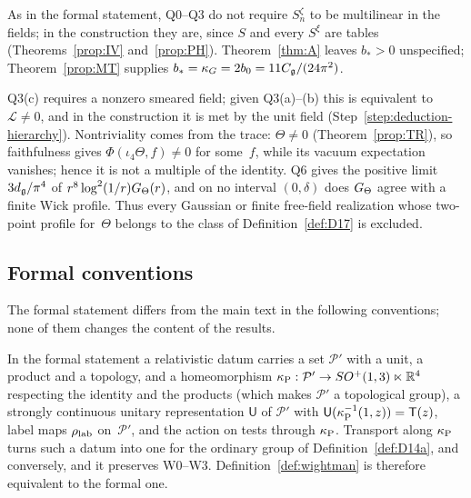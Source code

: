 As in the formal statement, Q0--Q3 do not require $S_n^\zeta$ to be multilinear in the fields; in the construction they are, since $S$ and every $S^\xi$ are tables (Theorems~\ref{prop:IV} and~\ref{prop:PH}). Theorem~\ref{thm:A} leaves $b_*>0$ unspecified; Theorem~\ref{prop:MT} supplies $b_*=\kappa_G=2b_0=11C_{\mathfrak{g}}/(24\pi^2)$.

\begin{remark}[Nontriviality]\label{rem:nontriviality}
Q3(c) requires a nonzero smeared field; given Q3(a)--(b) this is equivalent to $\mathcal L\ne0$, and in the construction it is met by the unit field (Step~\ref{step:deduction-hierarchy}). Nontriviality comes from the trace: $\Theta\ne0$ (Theorem~\ref{prop:TR}), so faithfulness gives $\Phi(\iota_4\Theta,f)\ne0$ for some~$f$, while its vacuum expectation vanishes; hence it is not a multiple of the identity. Q6 gives the positive limit $3d_{\mathfrak{g}}/\pi^4$ of $r^8\log^2(1/r)G_{\Theta}(r)$, and on no interval $(0,\delta)$ does $G_{\Theta}$ agree with a finite Wick profile. Thus every Gaussian or finite free-field realization whose two-point profile for~$\Theta$ belongs to the class of Definition~\ref{def:D17} is excluded.
\end{remark}

\subsection{Formal conventions}\label{sec:formal-conventions}

The formal statement differs from the main text in the following conventions; none of them changes the content of the results.

\begin{remark}\label{rem:formal-poincare}
In the formal statement a relativistic datum carries a set $\mathcal P'$ with a unit, a product and a topology, and a homeomorphism $\kappa_{\rm P}:\mathcal P'\to SO^+(1,3)\ltimes\mathbb{R}^4$ respecting the identity and the products (which makes $\mathcal P'$ a topological group), a strongly continuous unitary representation $\mathsf U$ of $\mathcal P'$ with $\mathsf U(\kappa_{\rm P}^{-1}(1,z))=\mathsf T(z)$, label maps $\rho_{\rm lab}$ on~$\mathcal P'$, and the action on tests through $\kappa_{\rm P}$. Transport along $\kappa_{\rm P}$ turns such a datum into one for the ordinary group of Definition~\ref{def:D14a}, and conversely, and it preserves W0--W3. Definition~\ref{def:wightman} is therefore equivalent to the formal one.
\end{remark}

